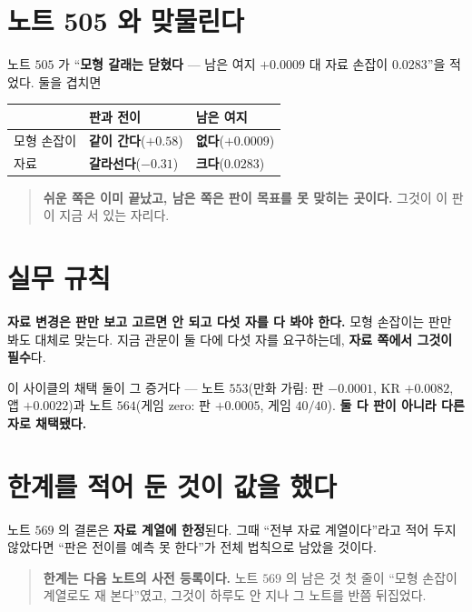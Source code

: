 \documentclass[11pt]{article}
\begin{document}
\section{노트 505 와 맞물린다}

노트 $505$ 가 ``\textbf{모형 갈래는 닫혔다} --- 남은 여지 $+0.0009$ 대 자료
손잡이 $0.0283$''을 적었다. 둘을 겹치면

\begin{center}
\begin{tabular}{lll}
\hline
 & 판과 전이 & 남은 여지 \\
\hline
모형 손잡이 & \textbf{같이 간다}($+0.58$) & \textbf{없다}($+0.0009$) \\
자료 & \textbf{갈라선다}($-0.31$) & \textbf{크다}($0.0283$) \\
\hline
\end{tabular}
\end{center}

\begin{quote}
\textbf{쉬운 쪽은 이미 끝났고, 남은 쪽은 판이 목표를 못 맞히는 곳이다.}
그것이 이 판이 지금 서 있는 자리다.
\end{quote}

\section{실무 규칙}

\textbf{자료 변경은 판만 보고 고르면 안 되고 다섯 자를 다 봐야 한다.}
모형 손잡이는 판만 봐도 대체로 맞는다. 지금 관문이 둘 다에 다섯 자를
요구하는데, \textbf{자료 쪽에서 그것이 필수}다.

이 사이클의 채택 둘이 그 증거다 --- 노트 $553$(만화 가림: 판 $-0.0001$,
KR $+0.0082$, 앱 $+0.0022$)과 노트 $564$(게임 zero: 판 $+0.0005$, 게임
$40/40$). \textbf{둘 다 판이 아니라 다른 자로 채택됐다.}

\section*{한계를 적어 둔 것이 값을 했다}

노트 $569$ 의 결론은 \textbf{자료 계열에 한정}된다. 그때 ``전부 자료
계열이다''라고 적어 두지 않았다면 ``판은 전이를 예측 못 한다''가 전체
법칙으로 남았을 것이다.

\begin{quote}
\textbf{한계는 다음 노트의 사전 등록이다.} 노트 $569$ 의 남은 것 첫 줄이
``모형 손잡이 계열로도 재 본다''였고, 그것이 하루도 안 지나 그 노트를
반쯤 뒤집었다.
\end{quote}
\end{document}
